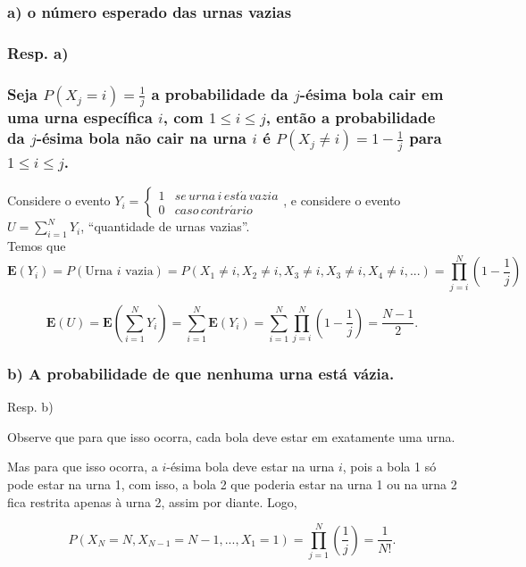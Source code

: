 \documentclass[portuguese]{article}
\begin{document}
\subsubsection*{\textmd{a) o número esperado das urnas vazias}}


\subsubsection*{\textmd{Resp}. \textmd{a) }}


\subsubsection*{\textmd{Seja $P(X_{j}=i)=\frac{1}{j}$ a probabilidade da $j$-ésima
bola cair em uma urna específica $i$, com $1\leq i\leq j$, então a probabilidade da $j$-ésima
bola não cair na urna $i$ é $P(X_{j}\neq i)=1-\frac{1}{j}$ para $1\leq i\leq j$.}}

Considere o evento $Y_{i}=\begin{cases}
1 & se\, urna\, i\, est\acute{a}\, vazia\\
0 & caso\, contr\acute{a}rio
\end{cases}$, e considere o evento $U=\sum_{i=1}^{N}Y_{i}$, ``quantidade de
urnas vazias''.\\
Temos que 
$$\mathbf{E}(Y_{i})=P(\text{Urna $i$ vazia})=P(X_{1}\neq i,X_{2}\neq i,X_{3}\neq i,X_{3}\neq i,X_{4}\neq i,...)=\prod_{j=i}^{N}(1-\frac{1}{j})$$

$$\mathbf{E}(U)=\mathbf{E}(\sum_{i=1}^{N}Y_{i})=\sum_{i=1}^{N}\mathbf{E}(Y_{i})=\sum_{i=1}^{N}\prod_{j=i}^{N}(1-\frac{1}{j})=\frac{N-1}{2}.$$


\subsubsection*{\textmd{b) A probabilidade de que nenhuma urna está vázia.}}

Resp. b)

Observe que para que isso ocorra, cada bola deve estar em exatamente
uma urna.

Mas para que isso ocorra, a $i$-ésima bola deve estar na urna $i$, pois
a bola 1 só pode estar na urna 1, com isso, a bola 2 que poderia estar
na urna 1 ou na urna 2 fica restrita apenas à urna 2, assim por diante.
Logo,

$$P(X_{N}=N,X_{N-1}=N-1,...,X_{1}=1)=\prod_{j=1}^{N}(\frac{1}{j})=\frac{1}{N!}.$$


\subsection*{\textcompwordmark{}}
\end{document}
